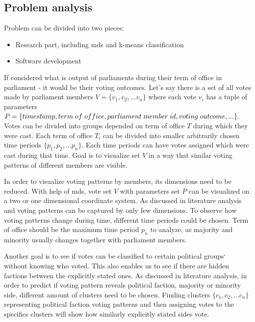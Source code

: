 \documentclass[a4paper,12pt]{article}
\begin{document}
	\clearpage
	
	
	\subsection{Problem analysis}
	
	Problem can be divided into two pieces:
	\begin{itemize}
		\item Research part, including \gls{mds} and \gls{k-means} classification
		\item Software development
	\end{itemize}
	
	If considered what is output of parliaments during their term of office in parliament - it would be their voting outcomes. Let's say there is a set of all votes made by parliament members $V = \{v_1, v_2, ... v_n\}$ where each vote $v_i$ has a tuple of parameters
	$	P = \{timestamp, term\; of\; office, \\ parliament\;member\;id, voting\;outcome,...\}.$	
	Votes can be divided into groups depended on term of office $T$ during which they were cast. Each term of office $T_i$ can be divided into smaller arbitrarily chosen time periods $\{p_1, p_2, ...p_n\}$. Each time periods can have votes assigned which were cast during that time. Goal is to visualize set $V$ in a way that similar voting patterns of different members are visible. 
	
	In order to visualize voting patterns by members, its dimensions need to be reduced. With help of \acrfull{mds}, vote set $V$ with parameters set $P$ can be visualized on a two or one dimensional coordinate system. As discussed in literature analysis and \cite{poole_2005} voting patterns can be captured by only few dimensions. To observe how voting patterns change during time, different time periods could be chosen. Term of office should be the maximum time period $p_n$ to analyze, as majority and minority usually changes together with parliament members.
	
	Another goal is to see if votes can be classified to certain political groups` without knowing who voted. This also enables us to see if there are hidden factions between the explicitly stated ones. As discussed in literature analysis, in order to predict if voting pattern reveals political faction, majority or minority side, different amount of clusters need to be chosen. Finding clusters $\{c_1, c_2,...c_n\}$ representing political faction voting patterns and then assigning votes to the specifics clusters will show how similarly explicitly stated sides vote. 
	
\end{document}

